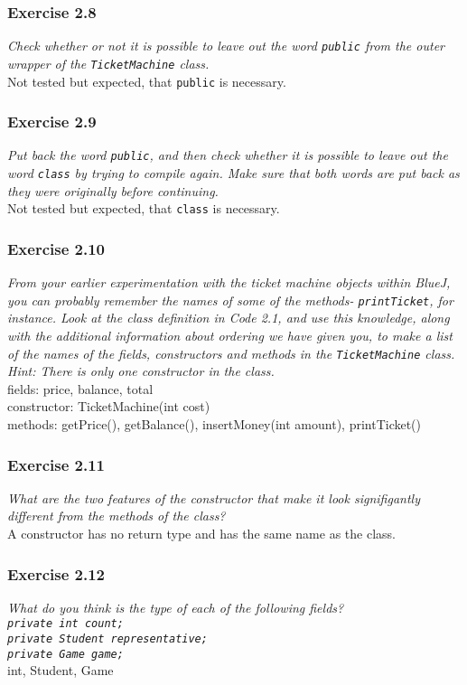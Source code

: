 \subsubsection*{Exercise 2.8}
\textit{Check whether or not it is possible to leave out the word \lstinline{public} 
from the outer wrapper of the \lstinline{TicketMachine} class. }\\
Not tested but expected, that \lstinline{public} is necessary. 

\subsubsection*{Exercise 2.9}
\textit{Put back the word \lstinline{public}, and then check whether it is possible 
to leave out the word \lstinline{class} by trying to compile again. Make sure that 
both words are put back as they were originally before continuing. }\\
Not tested but expected, that \lstinline{class} is necessary. 

\subsubsection*{Exercise 2.10}
\textit{From your earlier experimentation with the ticket machine objects 
within BlueJ, you can probably remember the names of some of the methods-
\lstinline{printTicket}, for instance. Look at the class definition in Code 2.1, 
and use this knowledge, along with the additional information about ordering 
we have given you, to make a list of the names of the fields, constructors and 
methods in the \lstinline{TicketMachine} class. Hint: There is only one constructor 
in the class. }\\
fields: price, balance, total\\
constructor: TicketMachine(int cost)\\
methods: getPrice(), getBalance(), insertMoney(int amount), printTicket()

\subsubsection*{Exercise 2.11}
\textit{What are the two features of the constructor that make it look 
signifigantly different from the methods of the class? }\\
A constructor has no return type and has the same name as the class. 

\subsubsection*{Exercise 2.12}
\textit{What do you think is the type of each of the following fields? \\
\lstinline{private int count;}\\
\lstinline{private Student representative;}\\
\lstinline{private Game game;}}\\
int, Student, Game

